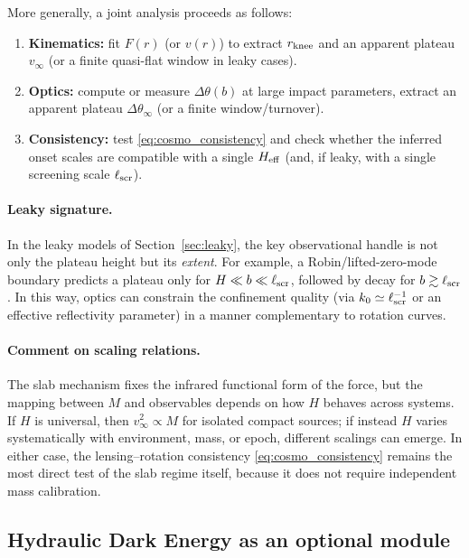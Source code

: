 \documentclass[11pt]{article}
\begin{document}
More generally, a joint analysis proceeds as follows:

\begin{enumerate}
\item \textbf{Kinematics:} fit $F(r)$ (or $v(r)$) to extract $r_{\rm knee}$ and an apparent plateau
      $v_\infty$ (or a finite quasi-flat window in leaky cases).

\item \textbf{Optics:} compute or measure $\Delta\theta(b)$ at large impact parameters, extract an
      apparent plateau $\Delta\theta_\infty$ (or a finite window/turnover).

\item \textbf{Consistency:} test \eqref{eq:cosmo_consistency} and check whether the inferred onset
      scales are compatible with a single $H_{\rm eff}$ (and, if leaky, with a single screening
      scale $\ell_{\rm scr}$).
\end{enumerate}

\paragraph{Leaky signature.}
In the leaky models of Section~\ref{sec:leaky}, the key observational handle is not only the plateau
height but its \emph{extent}.  For example, a Robin/lifted-zero-mode boundary predicts a plateau
only for $H\ll b\ll \ell_{\rm scr}$, followed by decay for $b\gtrsim \ell_{\rm scr}$.  In this way,
optics can constrain the confinement quality (via $k_0\simeq \ell_{\rm scr}^{-1}$ or an effective
reflectivity parameter) in a manner complementary to rotation curves.

\paragraph{Comment on scaling relations.}
The slab mechanism fixes the infrared functional form of the force, but the mapping between $M$ and
observables depends on how $H$ behaves across systems.
If $H$ is universal, then $v_\infty^2\propto M$ for isolated compact sources; if instead $H$ varies
systematically with environment, mass, or epoch, different scalings can emerge.  In either case,
the lensing--rotation consistency \eqref{eq:cosmo_consistency} remains the most direct test of the
slab regime itself, because it does not require independent mass calibration.

\subsection{Hydraulic Dark Energy as an optional module}
\label{sec:cosmo_de}
\end{document}
